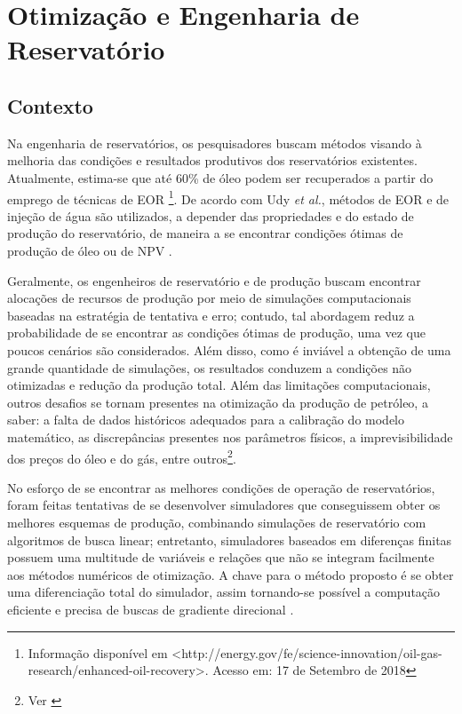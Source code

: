 \section{Otimização e Engenharia de Reservatório}
\subsection{Contexto}
Na engenharia de reservatórios, os pesquisadores buscam métodos visando à melhoria das condições e resultados produtivos dos reservatórios existentes. Atualmente, estima-se que até 60\% de óleo podem ser recuperados a partir do emprego de técnicas de EOR \footnote{Informação disponível em <http://energy.gov/fe/science-innovation/oil-gas-research/enhanced-oil-recovery>. Acesso em: 17 de Setembro de 2018}. De acordo com Udy \textit{et al.}, métodos de EOR e de injeção de água são utilizados, a depender das propriedades e do estado de produção do reservatório, de maneira a se encontrar condições ótimas de produção de óleo ou de NPV \cite{udyEOR}.

Geralmente, os engenheiros de reservatório e de produção buscam encontrar alocações de recursos de produção por meio de simulações computacionais baseadas na estratégia de tentativa e erro; contudo, tal abordagem reduz a probabilidade de se encontrar as condições ótimas de produção, uma vez que poucos cenários são considerados. Além disso, como é inviável a obtenção de uma grande quantidade de simulações, os resultados conduzem a condições não otimizadas e redução da produção total. Além das limitações computacionais, outros desafios se tornam presentes na otimização da produção de petróleo, a saber: a falta de dados históricos adequados para a calibração do modelo matemático, as discrepâncias presentes nos parâmetros físicos, a imprevisibilidade dos preços do óleo e do gás, entre outros\footnote{Ver \cite{udyEOR}}.

No esforço de se encontrar as melhores condições de operação de reservatórios, foram feitas tentativas de se desenvolver simuladores que conseguissem obter os melhores esquemas de produção, combinando simulações de reservatório com algoritmos de busca linear; entretanto, simuladores baseados em diferenças finitas possuem uma multitude de variáveis e relações que não se integram facilmente aos métodos numéricos de otimização. A chave para o método proposto é se obter uma diferenciação total do simulador, assim tornando-se possível a computação eficiente e precisa de buscas de gradiente direcional \cite{asheim88}. 

